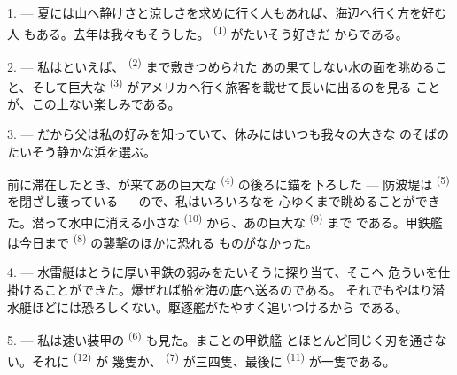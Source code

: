 %

\VUsaut{4.0mm}
\VUsaut{3.0mm}
\VUsaut{3.0mm}

1. --- 夏には山へ静けさと涼しさを求めに行く人もあれば、海辺へ行く方を好む人
もある。去年は我々もそうした。 \textsuperscript{(1)} がたいそう好きだ
からである。

2. --- 私はといえば、 \textsuperscript{(2)} まで敷きつめられた
あの果てしない水の面を眺めること、そして巨大な
\textsuperscript{(3)} がアメリカへ行く旅客を載せて長いに出るのを見る
ことが、この上ない楽しみである。

3. --- だから父は私の好みを知っていて、休みにはいつも我々の大きな
のそばのたいそう静かな浜を選ぶ。

前に滞在したとき、が来てあの巨大な
\textsuperscript{(4)} の後ろに錨を下ろした --- 防波堤は
\textsuperscript{(5)} を閉ざし護っている --- ので、私はいろいろなを
心ゆくまで眺めることができた。潜って水中に消える小さな
\textsuperscript{(10)} から、あの巨大な \textsuperscript{(9)} まで
である。甲鉄艦は今日まで \textsuperscript{(8)} の襲撃のほかに恐れる
ものがなかった。

\VUsaut{3.0mm}
\VUsaut{3.0mm}

4. --- 水雷艇はとうに厚い甲鉄の弱みをたいそうに探り当て、そこへ
危ういを仕掛けることができた。爆ぜれば船を海の底へ送るのである。
それでもやはり潜水艇ほどには恐ろしくない。駆逐艦がたやすく追いつけるから
である。

5. --- 私は速い装甲の \textsuperscript{(6)} も見た。まことの甲鉄艦
とほとんど同じく刃を通さない。それに \textsuperscript{(12)} が
幾隻か、 \textsuperscript{(7)} が三四隻、最後に
\textsuperscript{(11)} が一隻である。

